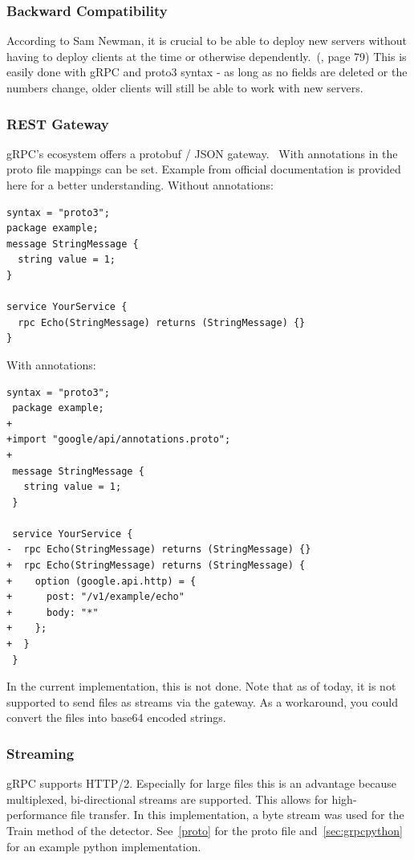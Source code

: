 \subsubsection{Backward Compatibility}
According to Sam Newman, it is crucial to be able to deploy new servers without having to deploy clients at the time or otherwise dependently.~(\cite{Newman2015BuildingMicroservices}, page 79) This is easily done with gRPC and proto3 syntax - as long as no fields are deleted or the numbers change, older clients will still be able to work with new servers.
\subsubsection{REST Gateway}
gRPC's ecosystem offers a protobuf / JSON gateway.~\cite{N.A.2017Grpc-gateway.2018} With annotations in the proto file mappings can be set. Example from official documentation is provided here for a better understanding. Without annotations:

\begin{lstlisting}[language=protobuf3,style=protobuf]
syntax = "proto3";
package example;
message StringMessage {
  string value = 1;
}

service YourService {
  rpc Echo(StringMessage) returns (StringMessage) {}
}
\end{lstlisting}

With annotations:

\begin{lstlisting}[language=protobuf3,style=protobuf]
 syntax = "proto3";
 package example;
+
+import "google/api/annotations.proto";
+
 message StringMessage {
   string value = 1;
 }

 service YourService {
-  rpc Echo(StringMessage) returns (StringMessage) {}
+  rpc Echo(StringMessage) returns (StringMessage) {
+    option (google.api.http) = {
+      post: "/v1/example/echo"
+      body: "*"
+    };
+  }
 }
\end{lstlisting}

In the current implementation, this is not done. Note that as of today, it is not supported to send files as streams via the gateway. As a workaround, you could convert the files into base64 encoded strings. 
\subsubsection{Streaming}
gRPC supports HTTP/2. Especially for large files this is an advantage because multiplexed, bi-directional streams are supported. This allows for high-performance file transfer. In this implementation, a byte stream was used for the Train method of the detector. See~\ref{proto} for the proto file and~\ref{sec:grpcpython} for an example python implementation.

